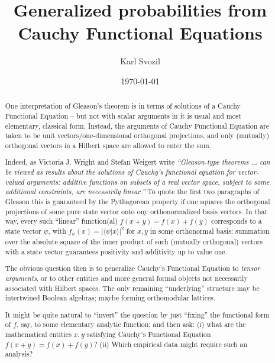 \documentclass[%
  preprint,
 showpacs,
 showkeys,
 preprintnumbers,
 amsmath,amssymb,
 aps,
  pra,
  longbibliography,
 ]{revtex4-1}
\begin{document}
\title{Generalized probabilities from Cauchy Functional Equations}


\author{Karl Svozil}




\date{\today}

\begin{abstract}
One interpretation of Gleason's theorem is in terms of solutions of a Cauchy Functional Equation -- but not with scalar arguments in it is usual and most elementary, classical form.
Instead, the  arguments of Cauchy Functional Equation are taken to be unit vectors/one-dimensional orthogonal projections, and only  (mutually) orthogonal vectors in a Hilbert space are allowed to enter the sum.

Indeed, as Victoria J. Wright and Stefan Weigert write {\em ``Gleason-type theorems $\ldots$ can be viewed as results about the solutions of Cauchy's functional equation for vector-valued arguments: additive functions on subsets of a real vector space, subject to some additional constraints, are necessarily linear.''}
To quote the first two paragraphs of Gleason this is guaranteed by the Pythagorean property if one squares the orthogonal projections of some pure state vector onto ony orthonormalized basis vectors. In that way, every such ``linear'' function(al) $f(x+y)=f(x)+f(y)$   corresponds to a state vector $\psi$,  with $f_\psi(x)= \vert \langle \psi | x\rangle\vert^2$ for $x,y$ in some orthonormal basis: summation over the absolute square of  the inner product of such (mutually orthogonal) vectors with a state vector guarantees positivity and additivity up to value one.

The obvious question then is to generalize Cauchy's Functional Equation to {\em tensor arguments}, or to other entities and more general formal objects not necessarily associated with Hilbert spaces. The only remaining ``underlying'' structure may be intertwined Boolean algebras; maybe forming orthomodular lattices.

It might be quite natural to ``invert'' the question by just ``fixing'' the functional form of $f$, say, to some elementary analytic function; and then ask: (i) what are the mathematical entities $x,y$ satisfying Cauchy's Functional Equation $f(x+y) = f(x)+f(y)$? (ii) Which empirical data might require such an analysis?


\end{abstract}
\end{document}
